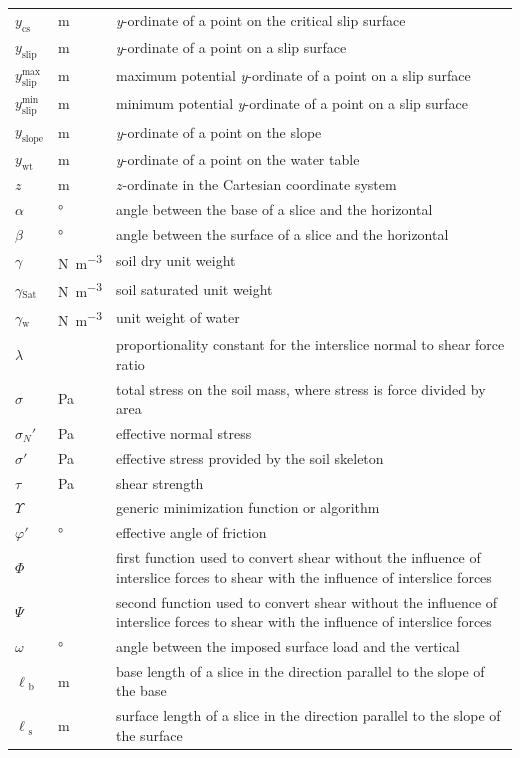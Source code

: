 \documentclass[12pt]{article}
\begin{document}
\begin{longtable*}{  l  l  p{8.5cm}  }
\\
$y_{\text{cs}}$ & \si{\meter} & \textit{y}-ordinate of a point on the critical 
slip 
surface
\\
${y_{\text{slip}}}$ & \si{\meter}& \textit{y}-ordinate of a point on a slip 
surface
\\
${y_{\text{slip}}^{\text{max}}}$ &  \si{\meter}& maximum potential 
\textit{y}-ordinate of a point on a slip surface
\\
${y_{\text{slip}}^{\text{min}}}$ &  \si{\meter}& minimum potential 
\textit{y}-ordinate of a point on a slip surface
\\
${y_{\text{slope}}}$ &  \si{\meter}& \textit{y}-ordinate of a point on the 
slope 
\\
${y_{\text{wt}}}$ &  \si{\meter}& \textit{y}-ordinate of a point on the water 
table
\\
$z$ & \si{\meter} & $z$-ordinate in the Cartesian coordinate system
\\
$\alpha{}$ & \si{\degree} & angle between the base of a slice and the horizontal
\\
$\beta{}$ &\si{\degree} & angle between the surface of a slice and the 
horizontal
\\
$\gamma{}$ & \si{\newton\per\cubic\meter} & soil dry unit weight
\\
${\gamma{}_{\text{Sat}}}$ &  \si{\newton\per\cubic\meter} & soil saturated unit 
weight
\\
${\gamma{}_{\text{w}}}$ & \si{\newton\per\cubic\meter} & unit weight of water
\\
$\lambda{}$ & & proportionality constant for the interslice normal to shear 
force ratio
\\
$\sigma{}$ & \si{\pascal} & total stress on the soil mass, where stress is 
force divided by area 
\\
$\sigma{}_N'$ & \si{\pascal} & effective normal stress
\\
$\sigma{}'$ & \si{\pascal} & effective stress provided by the soil skeleton
\\
$\tau{}$ & \si{\pascal} & shear strength
\\
$\Upsilon{}$ & & generic minimization function or algorithm 
\\
$\varphi{}'$ & \si{\degree} & effective angle of friction
\\
$\Phi{}$ & & first function used to convert shear without the 
influence of interslice forces to shear with the influence of 
interslice forces
\\
$\Psi{}$ & & second function used to convert shear without the 
influence of interslice forces to shear with the influence of interslice 
forces
\\
$\omega{}$ & \si{\degree} & angle between the imposed surface load and the 
vertical
\\
${\ell{}_{\text{b}}}$ &  \si{\meter}& base length of a slice in the 
direction parallel to the slope of the base
\\
${\ell{}_{\text{s}}}$ &  \si{\meter}& surface length of a slice in the 
direction 
parallel to the slope of the surface \\

\hline
\end{longtable*}
\end{document}
